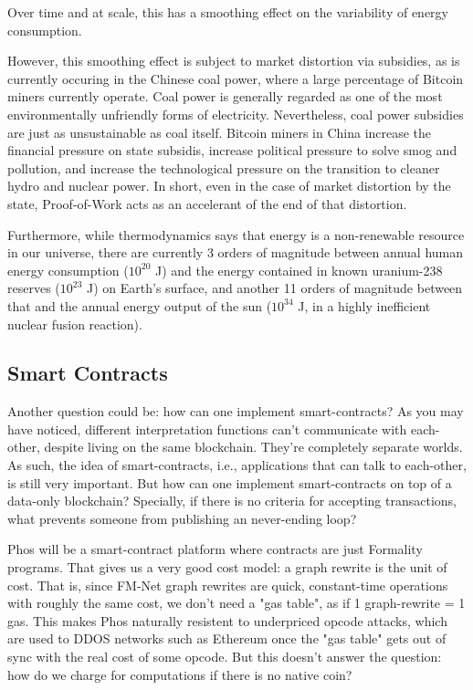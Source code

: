 \documentclass{article}
\theoremstyle{definition}
\theoremstyle{theorem}
\begin{document}
Over time and at scale, this has a smoothing effect on the variability of energy
consumption.

However, this smoothing effect is subject to market distortion via subsidies, as
is currently occuring in the Chinese coal power, where a large percentage of
Bitcoin miners currently operate. Coal power is generally regarded as one of the
most environmentally unfriendly forms of electricity. Nevertheless, coal power
subsidies are just as unsustainable as coal itself. Bitcoin miners in China
increase the financial pressure on state subsidis, increase political pressure
to solve smog and pollution, and increase the technological pressure on the
transition to cleaner hydro and nuclear power. In short, even in the case of
market distortion by the state, Proof-of-Work acts as an accelerant of the end
of that distortion.

Furthermore, while thermodynamics says that energy is a non-renewable resource
in our universe, there are currently 3 orders of magnitude between annual human
energy consumption ($10^{20}$ J) and the energy contained in known uranium-238
reserves ($10^{23}$ J) on Earth's surface, and another 11 orders of magnitude
between that and the annual energy output of the sun ($10^{34}$ J, in a highly
inefficient nuclear fusion reaction).

\subsection{Smart Contracts}

Another question could be: how can one implement smart-contracts? As you may
have noticed, different interpretation functions can't communicate with
each-other, despite living on the same blockchain. They're completely separate
worlds. As such, the idea of smart-contracts, i.e., applications that can talk
to each-other, is still very important. But how can one implement
smart-contracts on top of a data-only blockchain? Specially, if there is no
criteria for accepting transactions, what prevents someone from publishing an
never-ending loop?

Phos will be a smart-contract platform where contracts are just Formality
programs. That gives us a very good cost model: a graph rewrite is the unit of
cost. That is, since FM-Net graph rewrites are quick, constant-time operations
with roughly the same cost, we don't need a "gas table", as if 1 graph-rewrite =
1 gas. This makes Phos naturally resistent to underpriced opcode attacks, which
are used to DDOS networks such as Ethereum once the "gas table" gets out of sync
with the real cost of some opcode. But this doesn't answer the question: how do
we charge for computations if there is no native coin?
\end{document}
